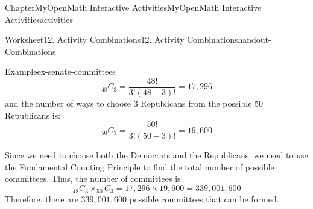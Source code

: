 \documentclass[oneside,10pt,]{book}
\newcommand{\blocktitlefont}{\relax}
\newcommand{\ptxlistdisc}{\raisebox{0.3ex}{\textbullet}}
\newlength{\fillinmaxwidth}
\newlength{\fillincontract}
\newlength{\charmaxwidth}\setlength{\charmaxwidth}{0.5em}
\newlength{\charminwidth}\setlength{\charminwidth}{0.1em}
\newlength{\fillinheight}
\newcommand{\fillintext}[1]{%
\setlength{\fillinmaxwidth}{#1\charmaxwidth}%
\setlength{\fillincontract}{#1\charminwidth}%
\setlength{\fillinheight}{\baselineskip}\addtolength{\fillinheight}{1.2pt}%
\strut\nobreak\leaders\vbox{\hrule width 0.3pt height 0.3pt \vskip -1.2pt}\hskip 1\fillinmaxwidth minus \fillincontract\nobreak\strut%
}
\begin{document}
\begin{chapterptx}{Chapter}{MyOpenMath Interactive Activities}{}{MyOpenMath Interactive Activities}{}{}{activities}
\begin{worksheet-section}{Worksheet}{12. Activity Combinations}{}{12. Activity Combinations}{}{}{handout-Combinations}
\begin{example}{Example}{}{ex-senate-committees}
\begin{equation*}
_{48}C_{3} = \frac{48!}{3!(48-3)!} = 17,296
\end{equation*}
and the number of ways to choose \(3\) Republicans from the possible \(50\) Republicans is:%
\begin{equation*}
_{50}C_{3} = \frac{50!}{3!(50-3)!} = 19,600
\end{equation*}
%
\par
Since we need to choose both the Democrats and the Republicans, we need to use the Fundamental Counting Principle to find the total number of possible committees. Thus, the number of committees is:%
\begin{equation*}
_{48}C_{3} \times _{50}C_{3} = 17,296 \times 19,600 = 339,001,600
\end{equation*}
Therefore, there are \(339,001,600\) possible committees that can be formed.%
\end{example}
%
\end{worksheet-section}
\restoregeometry

\end{chapterptx}
\end{document}
